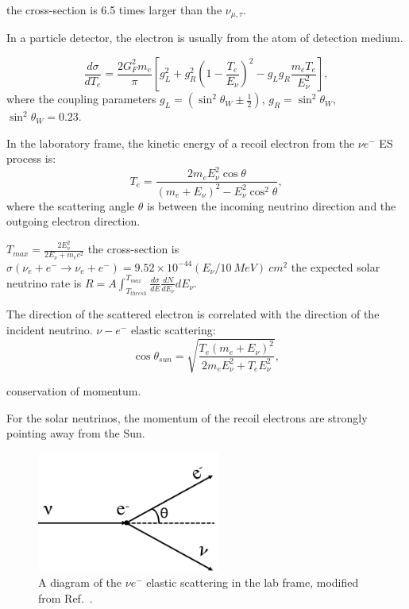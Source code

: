 the cross-section is 6.5 times larger than the $\nu_{\mu,\tau}$.


In a particle detector, the electron is usually from the atom of detection medium. 

\begin{equation}
\frac{d\sigma}{dT_e}=\frac{2G_F^2m_e}{\pi}[g_L^2+g_R^2\left(1-\frac{T_e}{E_\nu}\right)^2-g_Lg_R\frac{m_eT_e}{E_\nu^2}],
\end{equation}
where the coupling parameters $g_L=(\sin^2\theta_W\pm\frac{1}{2})$, $g_R=\sin^2\theta_W$, $\sin^2\theta_W=0.23$.

In the laboratory frame, the kinetic energy of a recoil electron from the $\nu e^-$ ES process is\cite{giunti2007fundamentals}:
\begin{equation}
T_e = \frac{2m_eE_\nu^2\cos\theta}{(m_e+E_\nu)^2-E_\nu^2\cos^2\theta},
\end{equation}
where the scattering angle $\theta$ is between the incoming neutrino direction and the outgoing electron direction.

$T_{max}=\frac{2E^2_\nu}{2E_\nu+m_e c^2}$
the cross-section is $\sigma(\nu_e+e^-\to \nu_e+e^-)=9.52\times 10^{-44}(E_\nu/10~MeV)~cm^2$
the expected solar neutrino rate is 
$R=A\int_{T_{thresh}}^{T_{max}}\frac{d\sigma}{dE}\frac{dN}{dE_\nu}dE_\nu$.

The direction of the scattered electron is correlated with the direction of the incident neutrino. 
$\nu-e^-$ elastic scattering: 
\begin{equation}\label{eq:costhetaSun}
\cos\theta_{sun}=\sqrt{\frac{T_e(m_e+E_\nu)^2}{2m_eE_\nu^2+T_eE_\nu^2}},
\end{equation}

conservation of momentum.


For the solar neutrinos, the momentum of the recoil electrons are strongly pointing away from the Sun.
\begin{figure}[htbp]
	\centering	
	\includegraphics[width=6cm]{ElasticScatteringCartoon.png}
	\caption{A diagram of the $\nu e^-$ elastic scattering in the lab frame, modified from Ref.~\cite{giunti2007fundamentals}.	\label{fig:ESdiagram}}
\end{figure}

